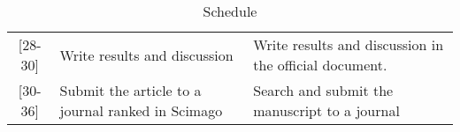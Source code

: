 \documentclass[journal]{IEEEtai}
\begin{document}
\begin{table*}[t]
\begin{tabular}{cll}
{[}28-30{]}      & Write results and discussion                            & Write results and discussion  in the official document.                                                                                                                                                                                                                                                                                                                                     \\
{[}30-36{]}      & Submit the article to a journal ranked in Scimago       & Search and submit the manuscript to a journal                                                                                                                                       \\ \hline
\end{tabular}
\caption{Schedule}
\label{Schedule}
\end{table*}







\newpage
\printbibliography
\end{document}
